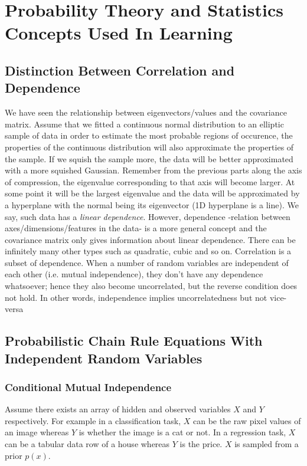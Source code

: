 \documentclass{book}
\numberwithin{equation}{subsection}
\begin{document}
\chapter{Probability Theory and Statistics Concepts Used In Learning}
\section{Distinction Between Correlation and Dependence}
\label{cor_dep}
We have seen the relationship between eigenvectors/values and the covariance matrix. Assume that we fitted a continuous normal distribution to an elliptic
sample of data in order to estimate the most probable regions of occurence, the properties of the continuous distribution will also approximate the properties of the sample. If we squish the sample more, the data will be better approximated with a more squished Gaussian. Remember from the previous parts along the axis of compression, the eigenvalue corresponding to that axis will become larger. At some point it will be the largest eigenvalue and the data will be approximated by a hyperplane with the normal being its eigenvector (1D hyperplane is a line). We say, such data has a \textit{linear dependence}. However, dependence -relation between axes/dimensions/features in the data- is a more general concept and the covariance matrix only gives information about linear dependence. There can be infinitely many other types such as quadratic, cubic and so on. Correlation is a subset of dependence. When a number of random variables are independent of each other (i.e. mutual independence), they don't have any dependence whatsoever; hence they also become uncorrelated, but the reverse condition does not hold. In other words, independence implies uncorrelatedness but not vice-versa
\section{Probabilistic Chain Rule Equations With Independent Random Variables}
\subsection{Conditional Mutual Independence}
\label{cond_mutual_independence}
Assume there exists an array of hidden and observed variables $X$ and $Y$ respectively. For example in a classification task, $X$ can be the raw pixel values of an image whereas $Y$ is whether the image is a cat or not. In a regression task, $X$ can be a tabular data row of a house whereas $Y$ is the price. $X$ is sampled from a prior $p(x)$.
\end{document}
